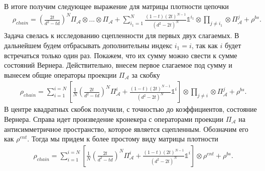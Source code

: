 В итоге получим следующее выражение для матрицы плотности цепочки
\begin{equation}
\begin{split}
& \rho_{chain} = 
\left(\frac{2t}{d^2 - td}\right)^N \Pi_{\mathcal A} \otimes ... \otimes \Pi_{\mathcal A}
+
\sum\limits_{i_1 = 1}^{N} \frac{(1-t)(2t)^{N-1}}{(d^2 - 2t)^N} \mathbb{1}^{i_1} \otimes \prod_{j \neq i_1} \otimes \Pi_{\mathcal A}^{j} + \rho^{bs}.
\end{split}
\end{equation}
Задача свелась к исследованию сцепленности для первых двух слагаемых.
В дальнейшем будем отбрасывать дополнительны индекс $i_1 = i$, так как $i$ будет встречаться только один раз.
Покажем, что их сумму можно свести к сумме состояний Вернера.
Действительно, внесем первое слагаемое под сумму и вынесем общие операторы проекции $\Pi_{\mathcal A}$ за скобку 
\begin{equation}
\begin{split}
& \rho_{chain} = 
\sum\limits_{i=1}^{i=N}
\left[
\frac{1}{N}\left(\frac{2t}{d^2 - td}\right)^N
\Pi_{\mathcal A}^{i} + 
\frac{(1-t)(2t)^{N-1}}{(d^2 - 2t)^N} \mathbb{1}^{i}
\right] 
\otimes \prod_{j \neq i} \otimes \Pi_{\mathcal A}^{j} + \rho^{bs}.
\end{split}
\end{equation}
В центре квадратных скобок получили, с точностью до коэффициентов, состояние Вернера. Справа идет произведение кронекера с операторами проекции $\Pi_{\mathcal A}$ на антисимметричное пространство, которое является сцепленным. Обозначим его как $\rho^{ent}$. Тогда мы придем к более простому виду матрицы плотности
\begin{equation}\label{rho-chain-end}
\begin{split}
& \rho_{chain} = 
\sum\limits_{i=1}^{i=N}
\left[
\frac{1}{N}\left(\frac{2t}{d^2 - td}\right)^N
\Pi_{\mathcal A}^{i} + 
\frac{(1-t)(2t)^{N-1}}{(d^2 - 2t)^N} \mathbb{1}^{i}
\right] \otimes
\rho^{ent} + \rho^{bs}.
\end{split}
\end{equation}


